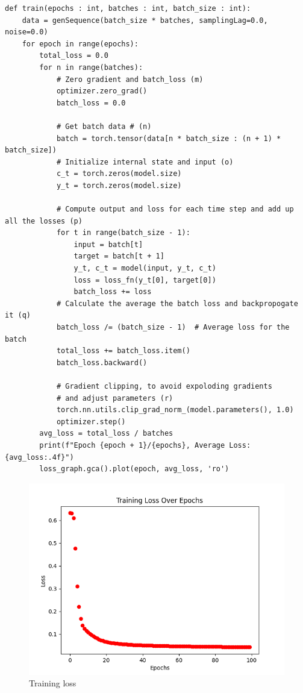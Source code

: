 \documentclass[twoside,a4paper,10pt,DIV=12,BCOR=12mm]{scrartcl}
\begin{document}
\begin{lstlisting}
def train(epochs : int, batches : int, batch_size : int):
    data = genSequence(batch_size * batches, samplingLag=0.0, noise=0.0)
    for epoch in range(epochs):
        total_loss = 0.0
        for n in range(batches):
            # Zero gradient and batch_loss (m)
            optimizer.zero_grad() 
            batch_loss = 0.0
            
            # Get batch data # (n)
            batch = torch.tensor(data[n * batch_size : (n + 1) * batch_size])    
            # Initialize internal state and input (o)
            c_t = torch.zeros(model.size)
            y_t = torch.zeros(model.size)
            
            # Compute output and loss for each time step and add up all the losses (p)
            for t in range(batch_size - 1):
                input = batch[t]
                target = batch[t + 1]
                y_t, c_t = model(input, y_t, c_t)
                loss = loss_fn(y_t[0], target[0])
                batch_loss += loss      
            # Calculate the average the batch loss and backpropogate it (q)
            batch_loss /= (batch_size - 1)  # Average loss for the batch
            total_loss += batch_loss.item()
            batch_loss.backward()
            
            # Gradient clipping, to avoid expoloding gradients
            # and adjust parameters (r)
            torch.nn.utils.clip_grad_norm_(model.parameters(), 1.0)
            optimizer.step() 
        avg_loss = total_loss / batches
        print(f"Epoch {epoch + 1}/{epochs}, Average Loss: {avg_loss:.4f}")
        loss_graph.gca().plot(epoch, avg_loss, 'ro')
\end{lstlisting}
\begin{figure}[h!]
    \centering
    \includegraphics[width=0.75\linewidth]{train_loss_graph.png}
    \caption{Training loss}
    \label{fig:train-loss-graph}
\end{figure}
\end{document}
